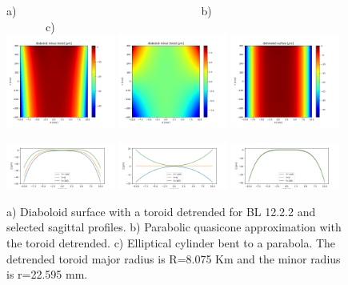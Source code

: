 \documentclass{iucr}              %
\begin{document}
\begin{figure}\label{fig:detrendedBeamline}
\flushleft
a)~~~~~~~~~~~~~~~~~~~~~~~~~~~~~~~~~b)~~~~~~~~~~~~~~~~~~~~~~~~~~~~~~c)\\
\centering
\includegraphics[width=0.32\textwidth]{figures/diaboloid_bl1222_detrended_image.png} 
\includegraphics[width=0.32\textwidth]{figures/paraboliccone_bl1222_detrended_image.png} 
\includegraphics[width=0.32\textwidth]{figures/ellipticalcylinder_bl1222_detrended_image.png} 


\includegraphics[width=0.32\textwidth]{figures/diaboloid_bl1222_detrended_profile.png}
\includegraphics[width=0.32\textwidth]{figures/paraboliccone_bl1222_detrended_profile.png}
\includegraphics[width=0.32\textwidth]{figures/ellipticalcylinder_bl1222_detrended_profile.png}

\caption{
a) Diaboloid surface with a toroid detrended for BL 12.2.2 and selected sagittal profiles. b) Parabolic quasicone approximation with the toroid detrended. c) Elliptical cylinder bent to a parabola. The detrended toroid major radius is R=8.075 Km and the minor radius is  r=22.595 mm.
}
\end{figure}
\end{document}

